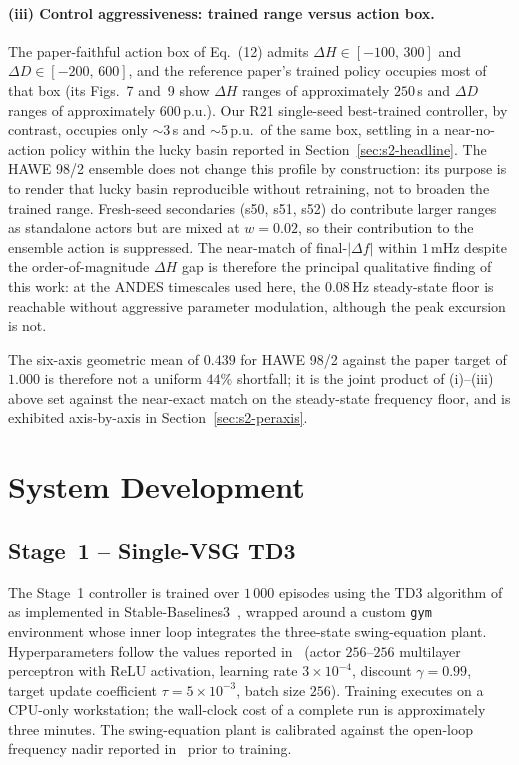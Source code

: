 \documentclass{unnc-fyp}
\begin{document}
\paragraph{(iii) Control aggressiveness: trained range versus action box.}
The paper-faithful action box of \cite{yang2023ddic} Eq.~(12) admits
$\Delta H \in [-100,\,300]$ and $\Delta D \in [-200,\,600]$, and the
reference paper's trained policy occupies most of that box (its
Figs.~7 and~9 show $\Delta H$ ranges of approximately $250$\,s and
$\Delta D$ ranges of approximately $600$\,p.u.). Our R21 single-seed
best-trained controller, by contrast, occupies only $\sim 3$\,s and
$\sim 5$\,p.u.\ of the same box, settling in a near-no-action policy
within the lucky basin reported in Section~\ref{sec:s2-headline}. The
HAWE 98/2 ensemble does not change this profile by construction: its
purpose is to render that lucky basin reproducible without retraining,
not to broaden the trained range. Fresh-seed secondaries (s50, s51,
s52) do contribute larger ranges as standalone actors but are mixed
at $w=0.02$, so their contribution to the ensemble action is
suppressed. The near-match of final-$|\Delta f|$ within $1$\,mHz
despite the order-of-magnitude $\Delta H$ gap is therefore the
principal qualitative finding of this work: at the ANDES timescales
used here, the $0.08$\,Hz steady-state floor is reachable without
aggressive parameter modulation, although the peak excursion is not.

The six-axis geometric mean of $0.439$ for HAWE 98/2 against the
paper target of $1.000$ is therefore not a uniform $44\%$ shortfall;
it is the joint product of (i)--(iii) above set against the
near-exact match on the steady-state frequency floor, and is
exhibited axis-by-axis in Section~\ref{sec:s2-peraxis}.

\section{System Development}

\subsection{Stage~1 -- Single-VSG TD3}

The Stage~1 controller is trained over $1\,000$ episodes using
the TD3 algorithm of~\cite{fujimoto2018td3} as implemented in
Stable-Baselines3~\cite{raffin2021sb3}, wrapped around a custom
\texttt{gym}~\cite{brockman2016gym} environment whose
inner loop integrates the three-state swing-equation plant.
Hyperparameters follow the values reported
in~\cite{benhmidouch2024td3} (actor $256$--$256$ multilayer
perceptron with ReLU activation, learning rate
$3 \times 10^{-4}$, discount $\gamma = 0.99$, target update
coefficient $\tau = 5 \times 10^{-3}$, batch size $256$).
Training executes on a CPU-only workstation; the wall-clock cost
of a complete run is approximately three minutes.
The swing-equation plant is calibrated against the open-loop
frequency nadir reported in~\cite{benhmidouch2024td3} prior to
training.
\end{document}
